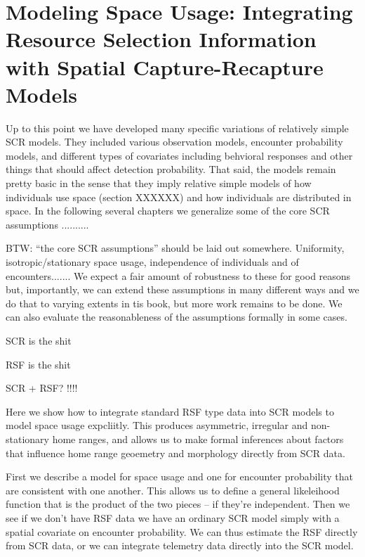 \chapter{
Modeling Space Usage: 
Integrating Resource Selection Information with 
Spatial Capture-Recapture
  Models}

\label{chapt.rsf}


\vspace{.3in}

Up to this point we have developed many specific variations of
relatively simple SCR models. They included various observation
models, encounter probability models, and different types of covariates including behvioral responses
and other things that should affect detection probability.
That said, the models remain pretty basic in the sense that they imply
relative simple models of how individuals use space (section XXXXXX) and how
individuals are distributed in space.  In the following several
chapters we generalize some of the core SCR assumptions ..........

BTW: ``the core SCR assumptions'' should be laid out
somewhere. Uniformity, isotropic/stationary space usage, independence
of individuals and of encounters.......  We expect a fair amount of
robustness to these for good reasons but, importantly, we can extend
these assumptions in many different ways and we do that to varying
extents in tis book, but more work remains to be done. We can also
evaluate the reasonableness of the assumptions formally in some cases.

SCR is the shit

RSF is the shit

SCR + RSF? !!!!

Here we show how to integrate standard RSF type data into SCR models
to model space usage expcliitly. This produces asymmetric, irregular
and non-stationary home ranges, and allows us to make formal
inferences about factors that influence home range geoemetry and
morphology directly from SCR data.

First we describe a model for space usage and one for encounter
probability that are consistent with one another.
This allows us to define a general likeleihood function that is the
product of the two pieces -- if they're independent. 
Then we see if we don't have RSF data we have an ordinary SCR model
simply with a spatial covariate on encounter probability. We can thus
estimate the RSF directly from SCR data, or we can integrate telemetry
data directly into the SCR model. 

